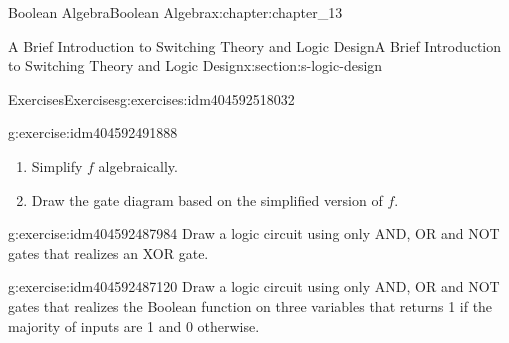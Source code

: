 \documentclass[twoside,10pt,]{book}
\numberwithin{equation}{section}
\begin{document}
\begin{chapterptx}{Boolean Algebra}{}{Boolean Algebra}{}{}{x:chapter:chapter_13}
\begin{sectionptx}{A Brief Introduction to Switching Theory and Logic Design}{}{A Brief Introduction to Switching Theory and Logic Design}{}{}{x:section:s-logic-design}
\begin{exercises-subsection}{Exercises}{}{Exercises}{}{}{g:exercises:idm404592518032}
\begin{divisionexercise}{6}{}{}{g:exercise:idm404592491888}
\par
%
\begin{enumerate}[label=(\alph*)]
\item{}Simplify \(f\) algebraically.%
\item{}Draw the gate diagram based on the simplified version of \(f\).%
\end{enumerate}
%
\end{divisionexercise}%
\begin{divisionexercise}{7}{}{}{g:exercise:idm404592487984}%
Draw a logic circuit using only AND, OR and NOT gates that realizes an XOR gate.%
\end{divisionexercise}%
\begin{divisionexercise}{8}{}{}{g:exercise:idm404592487120}%
Draw a logic circuit using only AND, OR and NOT gates that realizes the Boolean function on three variables that returns 1 if the majority of inputs are 1 and 0 otherwise.%
\end{divisionexercise}%
\end{exercises-subsection}
\end{sectionptx}
\end{chapterptx}
%
%
\typeout{************************************************}
\typeout{************************************************}
%
\end{document}
